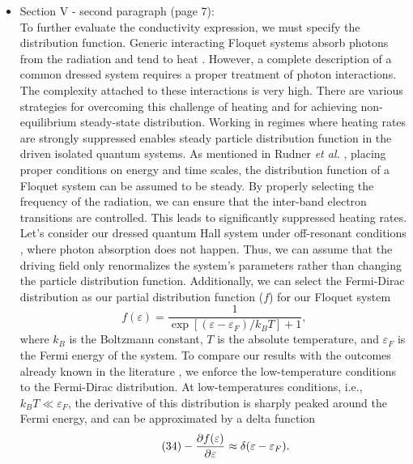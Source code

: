 \documentclass{article}
\begin{document}
\begin{itemize}
  \item Section V - second paragraph (page 7):\\
  {\color{Red}
  To further evaluate the conductivity expression, we must specify the distribution function. Generic interacting Floquet systems absorb photons from the radiation and tend to heat \cite{seetharam2019,rudner2020}.
  However, a complete description of a common dressed system requires a proper treatment of photon interactions. The complexity attached to these interactions is very high. There are various strategies \cite{lindner2017,bukov2015,eckardt2015,kuwahara2016,abanin2017,mori2018,rudner2020} for overcoming this challenge of heating and for achieving non-equilibrium steady-state distribution. Working in regimes where heating rates are strongly suppressed enables steady particle distribution function in the driven isolated quantum systems.
  As mentioned in Rudner \textit{et al.} \cite{rudner2020}, placing proper conditions on energy and time scales, the distribution function of a Floquet system can be assumed to be steady. By properly selecting the frequency of the radiation, we can ensure that the inter-band electron transitions are controlled. This leads to significantly suppressed heating rates.
  Let's consider our dressed quantum Hall system under off-resonant conditions \cite{rudner2020,wackerlthesis20}, where photon absorption does not happen. Thus, we can assume that the driving field only renormalizes the system's parameters rather than changing the particle distribution function.
  Additionally, we can select the Fermi-Dirac distribution as our partial distribution function ($f$) for our Floquet system
  \begin{equation} \tag{33}
    f(\varepsilon) = \frac{1}{\exp[(\varepsilon - \varepsilon_F)/k_B T]+1},
  \end{equation}
  where $k_B$ is the Boltzmann constant, $T$ is the absolute temperature, and $\varepsilon_F$ is the Fermi energy of the system. To compare our results with the outcomes already known in the literature \cite{dini16,endo09}, we enforce the low-temperature conditions to the Fermi-Dirac distribution.
  At low-temperatures conditions, i.e., $k_BT \ll \varepsilon_F$, the derivative of this distribution is sharply peaked around the Fermi energy, and can be approximated by a delta function \cite{endo09}
  \begin{equation} \tag{34}
    - \pdv{f(\varepsilon)}{\varepsilon} \approx \delta(\varepsilon - \varepsilon_F).
  \end{equation}
  }
\end{itemize}
\end{document}
